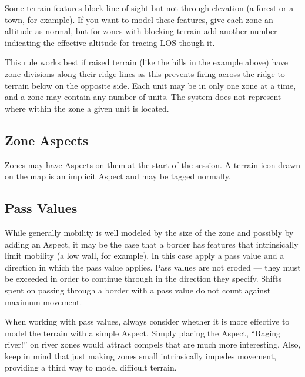 Some terrain features block line of sight but not through elevation (a forest or a town, for example). If you want to model these features, give each zone an altitude as normal, but for zones with blocking terrain add another number indicating the effective altitude for tracing LOS though it.

This rule works best if raised terrain (like the hills in the example above) have zone divisions along their ridge lines as this prevents firing across the ridge to terrain below on the opposite side. Each unit may be in only one zone at a time, and a zone may contain any number of units. The system does not represent where within the zone a given unit is located.


\subsection{Zone Aspects}
\label{sec:platoon-combat-zone-aspects}

Zones may have Aspects on them at the start of the session. A terrain icon drawn on the map is an implicit Aspect and may be tagged normally.


\subsection{Pass Values}
\label{sec:platoon-combat-pass-values}

While generally mobility is well modeled by the size of the zone and possibly by adding an Aspect, it may be the case that a border has features that intrinsically limit mobility (a low wall, for example). In this case apply a pass value and a direction in which the pass value applies. Pass values are not eroded --- they must be exceeded in order to continue through in the direction they specify. Shifts spent on passing through a border with a pass value do not count against maximum movement.

When working with pass values, always consider whether it is more effective to model the terrain with a simple Aspect. Simply placing the Aspect, ``Raging river!'' on river zones would attract compels that are much more interesting. Also, keep in mind that just making zones small intrinsically impedes movement, providing a third way to model difficult terrain.

